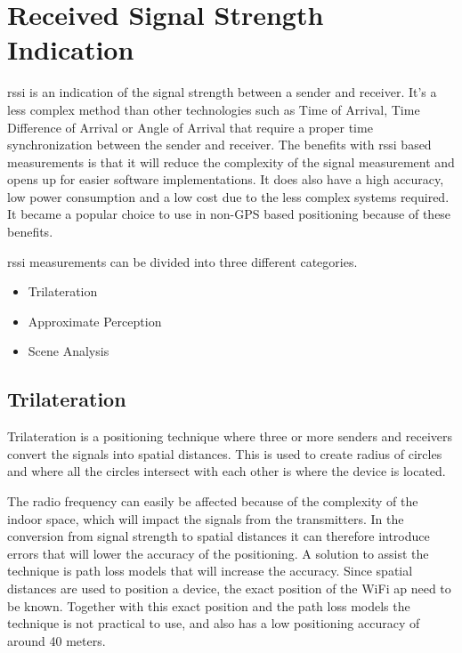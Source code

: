 \section{Received Signal Strength Indication}\label{sec:theoryRssi}
\acrfull{rssi} is an indication of the signal strength between a sender and receiver.
It's a less complex method than other technologies such as Time of Arrival, Time Difference of Arrival or
Angle of Arrival that require a proper time synchronization between the sender and receiver.
The benefits with \acrshort{rssi} based measurements is that it will reduce the complexity of the signal measurement and opens up for easier software implementations.
It does also have a high accuracy, low power consumption and a low cost due to the less complex systems required.
It became a popular choice to use in non-GPS based positioning because of these benefits.\cite{IndoorFingerprintPositioning2017, PerformanceAnalysisDiverse2013}

\bigskip

\acrshort{rssi} measurements can be divided into three different categories.

\begin{itemize}
	\item Trilateration
	\item Approximate Perception
	\item Scene Analysis \cite{IndoorFingerprintPositioning2017}
\end{itemize}

\subsection{Trilateration}\label{sec:theoryRssiTrilateration} Trilateration
is a positioning technique where three or more senders and receivers convert the signals
into spatial distances.  This is used to create radius of circles and where all
the circles intersect with each other is where the device is located.
\cite{IndoorFingerprintPositioning2017} 

\bigskip

The radio frequency can easily be affected because of the complexity of the indoor space, which will impact the signals from the transmitters.
In the conversion from signal strength to spatial distances it can therefore introduce errors that will lower the accuracy of the positioning.
A solution to assist the technique is path loss models that will increase the accuracy.
Since spatial distances are used to position a device, the exact position of the WiFi \acrfull{ap} need to be known.
Together with this exact position and the path loss models the technique is not practical to use, and also has a low positioning accuracy of around 40 meters.\cite{IndoorFingerprintPositioning2017}


